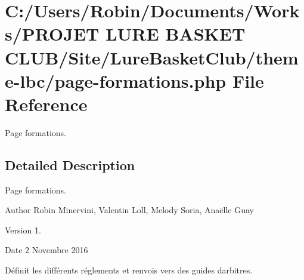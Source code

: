 \hypertarget{page-formations_8php}{}\section{C\+:/\+Users/\+Robin/\+Documents/\+Works/\+P\+R\+O\+J\+ET L\+U\+RE B\+A\+S\+K\+ET C\+L\+U\+B/\+Site/\+Lure\+Basket\+Club/theme-\/lbc/page-\/formations.php File Reference}
\label{page-formations_8php}


Page formations.  




\subsection{Detailed Description}
Page formations. 

\begin{DoxyAuthor}{Author}
Robin Minervini, Valentin Loll, Melody Soria, Anaëlle Guay 
\end{DoxyAuthor}
\begin{DoxyVersion}{Version}
1. 
\end{DoxyVersion}
\begin{DoxyDate}{Date}
2 Novembre 2016
\end{DoxyDate}
Définit les différents réglements et renvois vers des guides d\textquotesingle{}arbitres. 